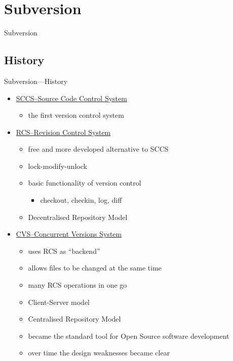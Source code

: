 \section{Subversion}

\begin{frame}
\begin{center}
\vspace{5em}
\Huge Subversion
\end{center}
\end{frame}

\subsection{History}
\begin{frame}{Subversion---History}
\begin{itemize}
\item \href{http://en.wikipedia.org/wiki/Source_Code_Control_System}
           {SCCS--Source Code Control System}
    \begin{itemize}
    \item the first version control system
    \end{itemize}
\item \href{http://en.wikipedia.org/wiki/Revision_Control_System}
           {RCS--Revision Control System}
    \begin{itemize}
    \item free and more developed alternative to SCCS
    \item lock-modify-unlock
    \item basic functionality of version control
        \begin{itemize}
        \item checkout, checkin, log, diff
        \end{itemize}
    \item Decentralised Repository Model
    \end{itemize}
\item \href{http://en.wikipedia.org/wiki/Concurrent_Versions_System}
           {CVS--Concurrent Versions System}
    \begin{itemize}
    \item uses RCS as \enquote{backend}
    \item allows files to be changed at the same time
    \item many RCS operations in one go
    \item Client-Server model
    \item Centralised Repository Model
    \item became the standard tool for Open Source software development
    \item over time the design weaknesses became clear
    \end{itemize}
\end{itemize}
\end{frame}

